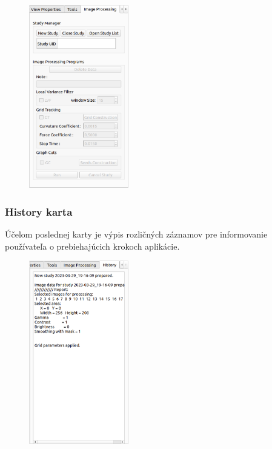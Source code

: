{\begin {figure}[H]
        \centering
        \includegraphics[height=8cm]{media/existing_app/tabs/image_processing_inactive.png}
        \captionsetup{justification=centering}
\end {figure}

\subsubsection {History karta}
Účelom poslednej karty  je výpis rozličných záznamov pre informovanie používateľa o prebiehajúcich krokoch aplikácie.

\begin {figure}[H]
        \centering
        \includegraphics[height=8cm]{media/existing_app/tabs/history.png}
        \captionsetup{justification=centering}
\end {figure}

}
